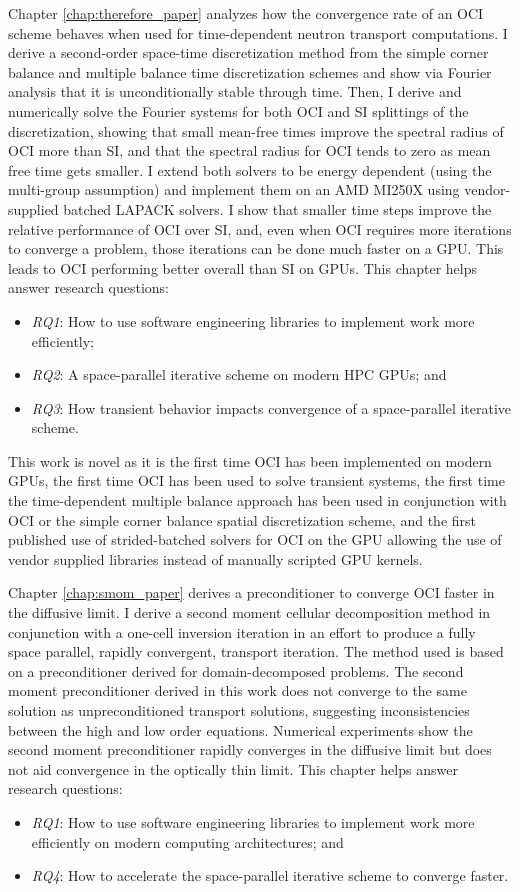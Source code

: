 Chapter \ref{chap:therefore_paper} analyzes how the convergence rate of an OCI scheme behaves when used for time-dependent neutron transport computations.
I derive a second-order space-time discretization method from the simple corner balance and multiple balance time discretization schemes and show via Fourier analysis that it is unconditionally stable through time.
Then, I derive and numerically solve the Fourier systems for both OCI and SI splittings of the discretization, showing that small mean-free times improve the spectral radius of OCI more than SI, and that the spectral radius for OCI tends to zero as mean free time gets smaller.
I extend both solvers to be energy dependent (using the multi-group assumption) and implement them on an AMD MI250X using vendor-supplied batched LAPACK solvers.
I show that smaller time steps improve the relative performance of OCI over SI, and, even when OCI requires more iterations to converge a problem, those iterations can be done much faster on a GPU.
This leads to OCI performing better overall than SI on GPUs.
This chapter helps answer research questions:
\begin{itemize}
    \item \emph{RQ1}: How to use software engineering libraries to implement work more efficiently;
    \item \emph{RQ2}: A space-parallel iterative scheme on modern HPC GPUs; and
    \item \emph{RQ3}: How transient behavior impacts convergence of a space-parallel iterative scheme.
\end{itemize}
This work is novel as it is the first time OCI has been implemented on modern GPUs, the first time OCI has been used to solve transient systems, the first time the time-dependent multiple balance approach has been used in conjunction with OCI or the simple corner balance spatial discretization scheme, and the first published use of strided-batched solvers for OCI on the GPU allowing the use of vendor supplied libraries instead of manually scripted GPU kernels.

Chapter \ref{chap:smom_paper} derives a preconditioner to converge OCI faster in the diffusive limit.
I derive a second moment cellular decomposition method in conjunction with a one-cell inversion iteration in an effort to produce a fully space parallel, rapidly convergent, transport iteration.
The method used is based on a preconditioner derived for domain-decomposed problems.
The second moment preconditioner derived in this work does not converge to the same solution as unpreconditioned transport solutions, suggesting inconsistencies between the high and low order equations.
Numerical experiments show the second moment preconditioner rapidly converges in the diffusive limit but does not aid convergence in the optically thin limit.
This chapter helps answer research questions:
\begin{itemize}
    \item \emph{RQ1}: How to use software engineering libraries to implement work more efficiently on modern computing architectures; and
    \item \emph{RQ4}: How to accelerate the space-parallel iterative scheme to converge faster.
\end{itemize}


